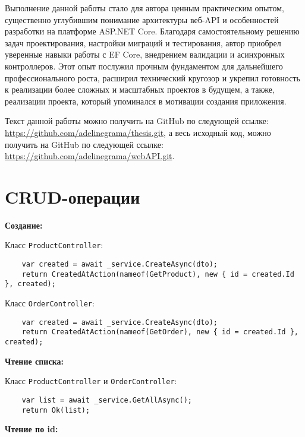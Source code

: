 \documentclass[a4paper,12pt]{report}
\newcommand{\githubthesis}{\url{https://github.com/adelinegrama/thesis.git}}
\newcommand{\githubwebAPI}{\url{https://github.com/adelinegrama/webAPI.git}}
\begin{document}
Выполнение данной работы стало для автора ценным практическим опытом, существенно углубившим понимание 
архитектуры веб-\acs{API} и особенностей разработки на платформе ASP.NET Core. 
Благодаря самостоятельному решению задач проектирования, настройки миграций и тестирования, 
автор приобрел уверенные навыки работы с \acs{EF} Core, внедрением валидации и асинхронных контроллеров. 
Этот опыт послужил прочным фундаментом для дальнейшего профессионального роста, расширил технический 
кругозор и укрепил готовность к реализации более сложных и масштабных проектов в будущем, а также, 
реализации проекта, который упоминался в мотивации создания приложения.


Текст данной работы можно получить на GitHub по следующей ссылке: \githubthesis, 
а весь исходный код, можно получить на GitHub по следующей ссылке: \githubwebAPI.

\newpage
{}







\section{\acs{CRUD}-операции}\label{crud}

\textbf{Создание:}

Класс \texttt{ProductController}:
\begin{verbatim}
    var created = await _service.CreateAsync(dto);
    return CreatedAtAction(nameof(GetProduct), new { id = created.Id }, created);
\end{verbatim}

Класс \texttt{OrderController}:
\begin{verbatim}
    var created = await _service.CreateAsync(dto);
    return CreatedAtAction(nameof(GetOrder), new { id = created.Id }, created);
\end{verbatim}

\textbf{Чтение списка:}

Класс \texttt{ProductController} и \texttt{OrderController}:
\begin{verbatim}
    var list = await _service.GetAllAsync();
    return Ok(list);
\end{verbatim}

\textbf{Чтение по id:}
\end{document}
